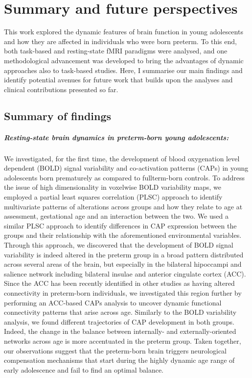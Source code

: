 \chapter{Summary and future perspectives}\label{chapter:ch6}

This work explored the dynamic features of brain function in young adolescents and how they are affected in individuals who were born preterm. To this end, both task-based and resting-state fMRI paradigms were analysed, and one methodological advancement was developed to bring the advantages of dynamic approaches also to task-based studies. Here, I summarise our main findings and identify potential avenues for future work that builds upon the analyses and clinical contributions presented so far. 

\section{Summary of findings}

\paragraph{Resting-state brain dynamics in preterm-born young adolescents:} We investigated, for the first time, the development of blood oxygenation level dependent (BOLD) signal variability and co-activation patterns (CAPs) in young adolescents born prematurely as compared to fullterm-born controls. To address the issue of high dimensionality in voxelwise BOLD variability maps, we employed a partial least squares correlation (PLSC) approach to identify multivariate patterns of alterations across groups and how they relate to age at assessment, gestational age and an interaction between the two. We used a similar PLSC approach to identify differences in CAP expression between the groups and their relationship with the aforementioned environmental variables. Through this approach, we discovered that the development of BOLD signal variability is indeed altered in the preterm group in a broad pattern distributed across several areas of the brain, but especially in the bilateral hipoccampi and salience network including bilateral insulae and anterior cingulate cortex (ACC). Since the ACC has been recently identified in other studies as having altered connectivity in preterm-born individuals, we investigated this region further by performing an ACC-based CAPs analysis to uncover dynamic functional connectivity patterns that arise across age. Similarly to the BOLD variability analysis, we found different trajectories of CAP development in both groups.  Indeed, the change in the balance between  internally- and externally-oriented networks across age is more accentuated in the preterm group. Taken together, our observations suggest that the preterm-born brain triggers neurological compensation mechanisms that start during the highly dynamic age range of early adolescence and fail to find an optimal balance.


